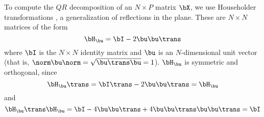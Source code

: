 \label{pcb:qr}

To compute the $QR$ decomposition of an $N \times P$ matrix
$\bX$, we use Householder transformations \cite{hous:1958},
a generalization of reflections in the plane.
These are $N \times N$ matrices of the form
\begin{displaymath}
\bH_{{\bu}} = \bI - 2 \bu \bu \trans
\end{displaymath}
where $\bI$ is the $N \times N$ identity matrix and $\bu$ is an
$N$-dimensional unit vector
(that is, $\norm \bu \norm  = \sqrt {\bu \trans \bu} = 1$).
$ \bH_{\bu}$ is symmetric and orthogonal, since
\begin{displaymath}
\bH_{\bu} \trans =
\bI \trans -  2 \bu \bu \trans = \bH_{\bu}
\end{displaymath}
and
\begin{displaymath}
\bH_{\bu} \trans \bH_{\bu} = \bI - 4 \bu \bu \trans +
4 \bu \bu \trans \bu \bu \trans = \bI
\end{displaymath}

